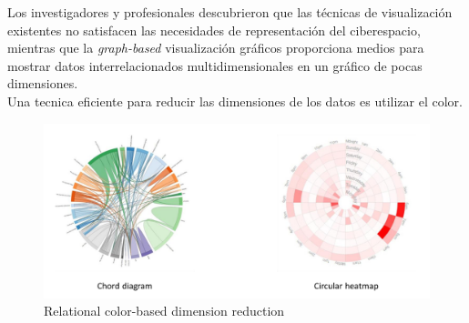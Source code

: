 \begin{paracol}{2}
   
   Los investigadores y profesionales descubrieron que las técnicas de visualización existentes no satisfacen las necesidades de representación del ciberespacio, mientras que la \emph{graph-based} visualización gráficos proporciona medios para mostrar datos interrelacionados multidimensionales en un gráfico de pocas dimensiones.\\
   Una tecnica eficiente para reducir las dimensiones de los datos es utilizar el color.

   \switchcolumn
   \begin{figure}[htbp]
      \centering
      \includegraphics{images/03/color.png}
      \caption{Relational color-based dimension reduction}
      \label{fig:03/color}
   \end{figure}
\end{paracol}

